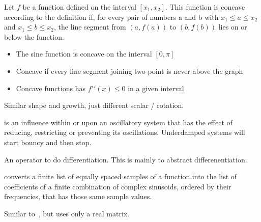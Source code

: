 \begin{definition}[Concave]
    Let $f$ be a function defined on the interval $[x_{1}, x_{2}]$.
    This function is concave according to the definition if, for every pair of
    numbers a and b with $x_{1} \leq a \leq x_{2}$ and $x_{1} \leq b \leq
    x_{2}$, the line segment from $(a,  f (a))$ to $(b,  f (b))$
    lies on or below the function.

    \begin{itemize}
        \item The sine function is concave on the interval $[0, \pi]$
        \item Concave if every line segment joining two point is never above
              the graph 
        \item Concave functions has $f\prime\prime(x) \leq 0$ in a given
              interval 
    \end{itemize}
\end{definition}

\begin{definition}[Congruence]
    Similar shape and growth, just different scalar / rotation.
\end{definition}


\begin{definition}[Damping]
    is an influence within or upon an oscillatory system that has the effect of
    reducing, restricting or preventing its oscillations. 
    Underdamped systems will start bouncy and then stop.

\end{definition}

\begin{definition}
    An operator to do differentiation. This is mainly to abstract
    differenentiation.

\end{definition}

\begin{definition}\label{dft}
    converts a finite list of equally spaced samples of a function into the
    list of coefficients of a finite combination of complex sinusoids, ordered
    by their frequencies, that has those same sample values.

\end{definition}

\begin{definition}
    Similar to~, but uses only a real matrix.

\end{definition}

